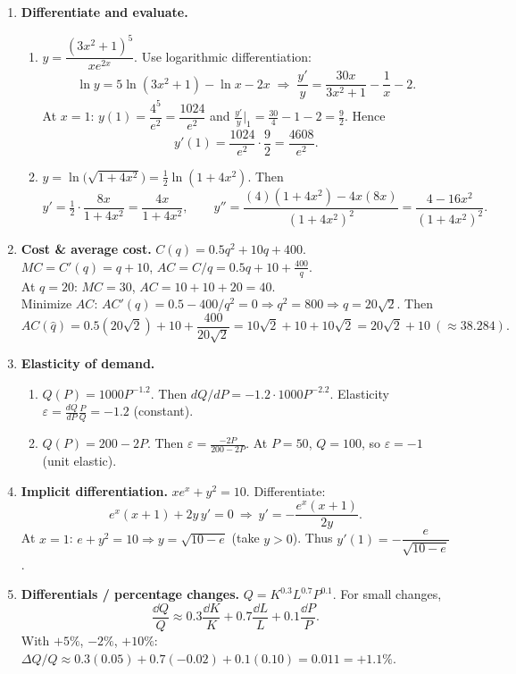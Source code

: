 \documentclass[12pt]{article}
\begin{document}
\begin{enumerate}[resume]
\item \textbf{Differentiate and evaluate.}
\begin{enumerate}[label=(\alph*)]
  \item $y=\dfrac{(3x^2+1)^5}{x e^{2x}}$. Use logarithmic differentiation:
  \[
  \ln y=5\ln(3x^2+1)-\ln x-2x\;\Rightarrow\; \frac{y'}{y}=\frac{30x}{3x^2+1}-\frac{1}{x}-2.
  \]
  At $x=1$: $y(1)=\dfrac{4^5}{e^2}=\dfrac{1024}{e^2}$ and $\frac{y'}{y}\big|_{1}=\frac{30}{4}-1-2=\frac{9}{2}$. Hence
  \[
  \boxed{y'(1)=\frac{1024}{e^2}\cdot\frac{9}{2}=\frac{4608}{e^2}}.
  \]

  \item $y=\ln\!\big(\sqrt{1+4x^2}\big)=\tfrac12\ln(1+4x^2)$. Then
  \[
  y'=\tfrac12\cdot \frac{8x}{1+4x^2}=\boxed{\frac{4x}{1+4x^2}},\qquad
  y''=\frac{(4)(1+4x^2)-4x(8x)}{(1+4x^2)^2}=\boxed{\frac{4-16x^2}{(1+4x^2)^2}}.
  \]
\end{enumerate}

\item \textbf{Cost \& average cost.} $C(q)=0.5q^2+10q+400$.\\
$MC=C'(q)=\boxed{q+10}$, $AC=C/q=\boxed{0.5q+10+\frac{400}{q}}$.\\
At $q=20$: $MC=30$, $AC=10+10+20=\boxed{40}$.\\
Minimize $AC$: $AC'(q)=0.5-400/q^2=0\Rightarrow q^2=800\Rightarrow \hat q=\boxed{20\sqrt{2}}$. Then
\[
AC(\hat q)=0.5(20\sqrt2)+10+\frac{400}{20\sqrt2}=10\sqrt2+10+10\sqrt2=\boxed{20\sqrt2+10}\ (\approx 38.284).
\]

\item \textbf{Elasticity of demand.}
\begin{enumerate}[label=(\alph*)]
  \item $Q(P)=1000P^{-1.2}$. Then $dQ/dP=-1.2\cdot 1000P^{-2.2}$. Elasticity $\varepsilon=\frac{dQ}{dP}\frac{P}{Q}=\boxed{-1.2}$ (constant).
  \item $Q(P)=200-2P$. Then $\varepsilon=\frac{-2P}{200-2P}$. At $P=50$, $Q=100$, so $\boxed{\varepsilon=-1}$ (unit elastic).
\end{enumerate}

\item \textbf{Implicit differentiation.} $x e^x+y^2=10$. Differentiate:
\[
e^x(x+1)+2y\,y'=0\ \Rightarrow\ \boxed{y'=-\dfrac{e^x(x+1)}{2y}}.
\]
At $x=1$: $e+y^2=10\Rightarrow y=\sqrt{10-e}$ (take $y>0$). Thus $\boxed{y'(1)=-\dfrac{e}{\sqrt{10-e}}}$.

\item \textbf{Differentials / percentage changes.} $Q=K^{0.3}L^{0.7}P^{0.1}$. For small changes,
\[
\frac{\dd Q}{Q}\approx 0.3\frac{\dd K}{K}+0.7\frac{\dd L}{L}+0.1\frac{\dd P}{P}.
\]
With $+5\%$, $-2\%$, $+10\%$: $\Delta Q/Q\approx 0.3(0.05)+0.7(-0.02)+0.1(0.10)=\boxed{0.011}=\boxed{+1.1\%}$.


\end{enumerate}
\end{document}
